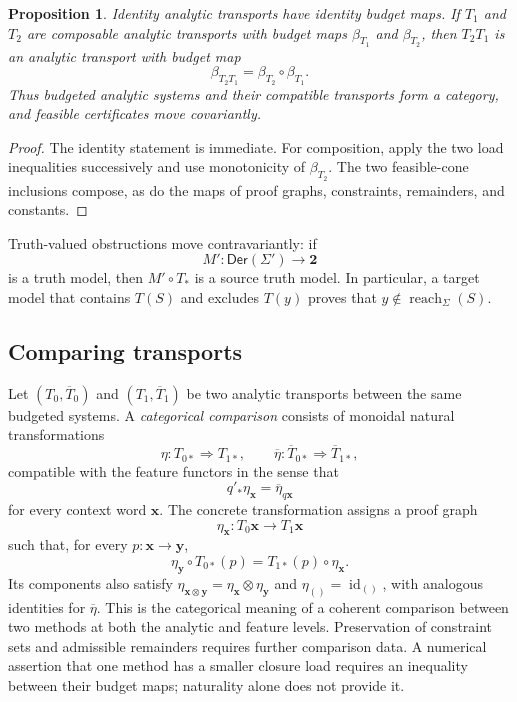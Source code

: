 \documentclass[10pt,journal,a4paper]{IEEEtran}
\newtheorem{proposition}[theorem]{Proposition}
\theoremstyle{definition}
\begin{document}
\begin{proposition}
Identity analytic transports have identity budget maps. If $T_1$ and $T_2$ are composable analytic transports with budget maps $\beta_{T_1}$ and $\beta_{T_2}$, then $T_2T_1$ is an analytic transport with budget map
\[
  \beta_{T_2T_1}
  =
  \beta_{T_2}\circ\beta_{T_1}.
\]
Thus budgeted analytic systems and their compatible transports form a category, and feasible certificates move covariantly.
\end{proposition}

\begin{proof}
The identity statement is immediate. For composition, apply the two load inequalities successively and use monotonicity of $\beta_{T_2}$. The two feasible-cone inclusions compose, as do the maps of proof graphs, constraints, remainders, and constants.
\end{proof}

Truth-valued obstructions move contravariantly: if
\[
  M':\mathsf{Der}(\Sigma')\longrightarrow\mathbf2
\]
is a truth model, then $M'\circ T_*$ is a source truth model. In particular, a target model that contains $T(S)$ and excludes $T(y)$ proves that $y\notin\operatorname{reach}_\Sigma(S)$.

\subsection{Comparing transports}

Let $(T_0,\overline T_0)$ and $(T_1,\overline T_1)$ be two analytic transports between the same budgeted systems. A \emph{categorical comparison} consists of monoidal natural transformations
\[
  \eta:T_{0*}\Longrightarrow T_{1*},
  \qquad
  \overline\eta:\overline T_{0*}\Longrightarrow\overline T_{1*},
\]
compatible with the feature functors in the sense that
\[
  q'_*\eta_{\mathbf x}
  =
  \overline\eta_{q\mathbf x}
\]
for every context word $\mathbf x$. The concrete transformation assigns a proof graph
\[
  \eta_{\mathbf x}:T_0\mathbf x\longrightarrow T_1\mathbf x
\]
such that, for every $p:\mathbf x\to\mathbf y$,
\[
  \eta_{\mathbf y}\circ T_{0*}(p)
  =
  T_{1*}(p)\circ\eta_{\mathbf x}.
\]
Its components also satisfy $\eta_{\mathbf x\otimes\mathbf y}=\eta_{\mathbf x}\otimes\eta_{\mathbf y}$ and $\eta_{()}=\operatorname{id}_{()}$, with analogous identities for $\overline\eta$. This is the categorical meaning of a coherent comparison between two methods at both the analytic and feature levels. Preservation of constraint sets and admissible remainders requires further comparison data. A numerical assertion that one method has a smaller closure load requires an inequality between their budget maps; naturality alone does not provide it.
\end{document}
